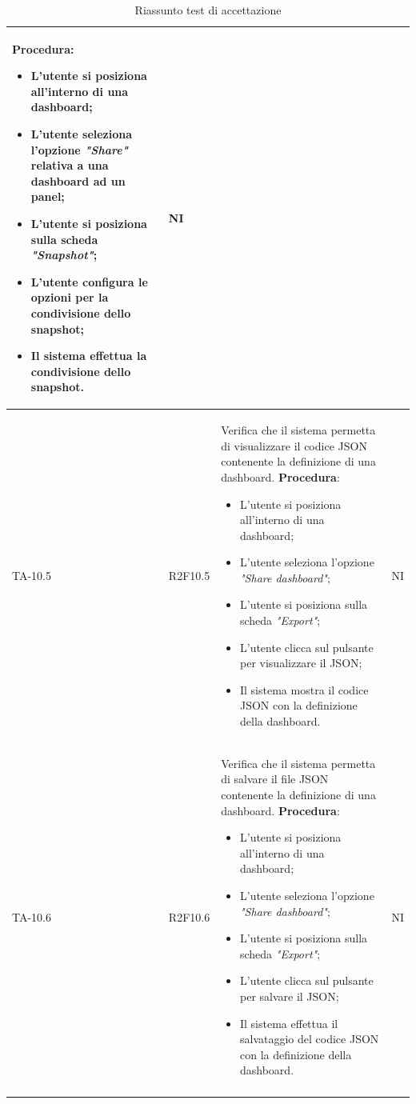 \begin{longtable}{|C{2.5cm}|C{2.5cm}|L{6.5cm}|C{1.5cm}|}
	\textbf{Procedura}:
	\begin{itemize}		
		\item L'utente si posiziona all'interno di una dashboard;
		\item L'utente seleziona l'opzione \emph{"Share"} relativa a una dashboard ad un panel;
		\item L'utente si posiziona sulla scheda \emph{"Snapshot"};
		\item L'utente configura le opzioni per la condivisione dello snapshot;
		\item Il sistema effettua la condivisione dello snapshot.
	\end{itemize}
	 & {NI}\\
	\hline
	{TA-10.5} & {R2F10.5} & 
	Verifica che il sistema permetta di visualizzare il codice JSON contenente la definizione
	di una dashboard.
	\textbf{Procedura}:
	\begin{itemize}		
		\item L'utente si posiziona all'interno di una dashboard;
		\item L'utente seleziona l'opzione \emph{"Share dashboard"};
		\item L'utente si posiziona sulla scheda \emph{"Export"};
		\item L'utente clicca sul pulsante per visualizzare il JSON;
		\item Il sistema mostra il codice JSON con la definizione della dashboard.
	\end{itemize}
	 & {NI}\\
	\hline
	{TA-10.6} & {R2F10.6} & 
	Verifica che il sistema permetta di salvare il file JSON contenente la definizione di una
	dashboard.
	\textbf{Procedura}:
	\begin{itemize}		
		\item L'utente si posiziona all'interno di una dashboard;
		\item L'utente seleziona l'opzione \emph{"Share dashboard"};
		\item L'utente si posiziona sulla scheda \emph{"Export"};
		\item L'utente clicca sul pulsante per salvare il JSON;
		\item Il sistema effettua il salvataggio del codice JSON con la definizione della dashboard.
	\end{itemize}
	 & {NI}\\
	\hline
	\caption{Riassunto test di accettazione}
	\label{tabella:riassunto ta}
\end{longtable}
